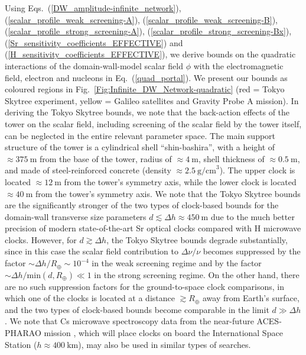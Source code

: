 \documentclass[aps,prd,onecolumn,nofootinbib]{revtex4-2} %
\begin{document}
Using Eqs.~(\ref{DW_amplitude-infinite_network}), (\ref{scalar_profile_weak_screening-A}), (\ref{scalar_profile_weak_screening-B}), (\ref{scalar_profile_strong_screening-A}), (\ref{scalar_profile_strong_screening-Bx}), (\ref{Sr_sensitivity_coefficients_EFFECTIVE}) and (\ref{H_sensitivity_coefficients_EFFECTIVE}), we derive bounds on the quadratic interactions of the domain-wall-model scalar field $\phi$ with the electromagnetic field, electron and nucleons in Eq.~(\ref{quad_portal}). 
We present our bounds as coloured regions in Fig.~\ref{Fig:Infinite_DW_Network-quadratic} (red = Tokyo Skytree experiment, yellow = Galileo satellites and Gravity Probe A mission). 
In deriving the Tokyo Skytree bounds, we note that the back-action effects of the tower on the scalar field, including screening of the scalar field by the tower itself, can be neglected in the entire relevant parameter space. 
The main support structure of the tower is a cylindrical shell ``shin-bashira'', with a height of $\approx 375~\textrm{m}$ from the base of the tower, radius of $\approx 4~\textrm{m}$, shell thickness of $\approx 0.5~\textrm{m}$, and made of steel-reinforced concrete (density $\approx 2.5~\textrm{g/cm}^3$). 
The upper clock is located $\approx 12~\textrm{m}$ from the tower's symmetry axis, while the lower clock is located $\approx 40~\textrm{m}$ from the tower's symmetry axis. 
We note that the Tokyo Skytree bounds are the significantly stronger of the two types of clock-based bounds for the domain-wall transverse size parameters $d \lesssim \Delta h \approx 450~\textrm{m}$ due to the much better precision of modern state-of-the-art Sr optical clocks compared with H microwave clocks. 
However, for $d \gtrsim \Delta h$, the Tokyo Skytree bounds degrade substantially, since in this case the scalar field contribution to $\Delta \nu / \nu$ becomes suppressed by the factor $\sim \Delta h / R_\oplus \sim 10^{-4}$ in the weak screening regime and by the factor $\sim \Delta h / \textrm{min} \left( d , R_\oplus \right) \ll 1$ in the strong screening regime. 
On the other hand, there are no such suppression factors for the ground-to-space clock comparisons, in which one of the clocks is located at a distance $\gtrsim R_\oplus$ away from Earth's surface, and the two types of clock-based bounds become comparable in the limit $d \gg \Delta h $. 
We note that Cs microwave spectroscopy data from the near-future ACES-PHARAO mission \cite{ACES_2015}, which will place clocks on board the International Space Station ($h \approx 400~\textrm{km}$), may also be used in similar types of searches. 
\end{document}
